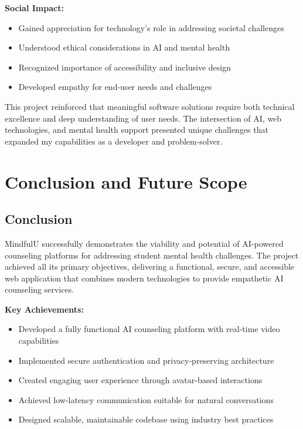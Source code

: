 \documentclass[11pt,a4paper]{article}
\begin{document}
\textbf{Social Impact:}
\begin{itemize}
    \item Gained appreciation for technology's role in addressing societal challenges
    \item Understood ethical considerations in AI and mental health
    \item Recognized importance of accessibility and inclusive design
    \item Developed empathy for end-user needs and challenges
\end{itemize}

This project reinforced that meaningful software solutions require both technical excellence and deep understanding of user needs. The intersection of AI, web technologies, and mental health support presented unique challenges that expanded my capabilities as a developer and problem-solver.

\newpage

\section{Conclusion and Future Scope}

\subsection{Conclusion}

MindfulU successfully demonstrates the viability and potential of AI-powered counseling platforms for addressing student mental health challenges. The project achieved all its primary objectives, delivering a functional, secure, and accessible web application that combines modern technologies to provide empathetic AI counseling services.

\textbf{Key Achievements:}
\begin{itemize}
    \item Developed a fully functional AI counseling platform with real-time video capabilities
    \item Implemented secure authentication and privacy-preserving architecture
    \item Created engaging user experience through avatar-based interactions
    \item Achieved low-latency communication suitable for natural conversations
    \item Designed scalable, maintainable codebase using industry best practices
\end{itemize}
\end{document}
